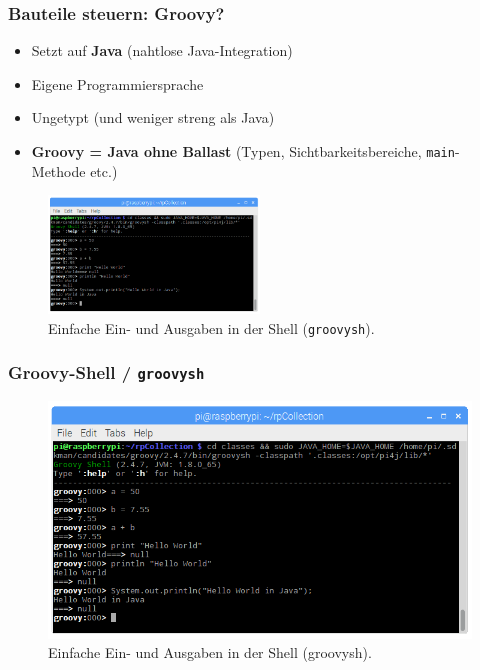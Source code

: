 \documentclass[usenames,dvipsnames]{beamer}
\begin{document}
\begin{frame}
\frametitle{Bauteile steuern: Groovy?}
\begin{itemize}
\item Setzt auf \textbf{Java} (nahtlose Java-Integration)
\item Eigene Programmiersprache 
\item Ungetypt (und weniger streng als Java)
\item \textbf{Groovy = Java ohne Ballast} (Typen, Sichtbarkeitsbereiche, \lstinline|main|-Methode etc.)
\end{itemize}

\vspace{-1.5em}
\begin{figure}[t]
	\centering
	\includegraphics[width=0.5\textwidth]{img/groovysh_einfache_eingaben.png}
	\caption{Einfache Ein- und Ausgaben in der Shell (\texttt{groovysh}).}
\end{figure}
\end{frame}


\begin{frame}
\frametitle{Groovy-Shell / \texttt{groovysh}}
\vspace{-1em}
\begin{figure}[t]
	\centering
	\includegraphics[width=1.0\textwidth]{img/groovysh_einfache_eingaben.png}
	\caption{Einfache Ein- und Ausgaben in der Shell ({groovysh}).}
\end{figure}
\end{frame}
\end{document}
